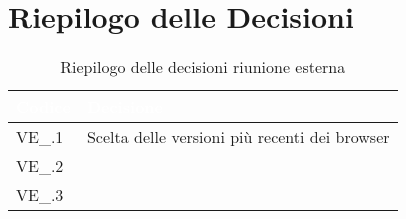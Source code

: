 \section{Riepilogo delle Decisioni}


\begin{table}[!htbp]
\renewcommand{\arraystretch}{1.5}
\begin{tabular}{m{}<{\centering}  m{}<{\centering}}
\rowcolor{darkblue} \textcolor{white}{\textbf{Codice}} & \textcolor{white}{\textbf{Decisione}} \\
\hline
VE\_\D{}.1 &  Scelta delle versioni più recenti dei browser\\
\rowcolor{gray!10} VE\_\D{}.2 &  \\
VE\_\D{}.3 & \\
\end{tabular}
\caption{Riepilogo delle decisioni riunione esterna \D{}}
\end{table}